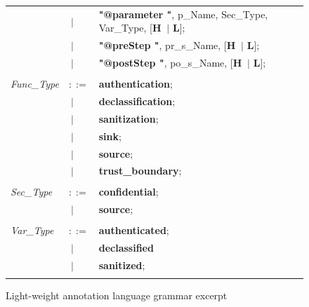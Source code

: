 \begin{figure}[ht!]
\begin{tabular}{lll}
 		&\footnotesize $\ \vert $    &\footnotesize \textbf{"@parameter "},   p\_Name,  Sec\_Type, Var\_Type,    [\textbf{H} $\ \vert $  \textbf{L}];    \\
 		&\footnotesize $\ \vert $    &\footnotesize \textbf{"@preStep "},     pr\_s\_Name,             [\textbf{H} $\ \vert $  \textbf{L}];    \\
 		&\footnotesize $\ \vert $    &\footnotesize \textbf{"@postStep "},    po\_s\_Name,             [\textbf{H} $\ \vert $  \textbf{L}];    \\ \\                                        
 		\footnotesize                       
 		\textit{Func\_Type}          &\footnotesize $::=$        &\footnotesize \textbf{authentication};\\
 		&\footnotesize $\ \vert $ &\footnotesize \textbf{declassification}; \\
 		&\footnotesize $\ \vert $    &\footnotesize \textbf{sanitization};     \\
 		&\footnotesize $\ \vert $    &\footnotesize \textbf{sink};             \\
 		&\footnotesize $\ \vert $    &\footnotesize \textbf{source};           \\
 		&\footnotesize $\ \vert $    &\footnotesize \textbf{trust\_boundary};  \\ \\
 		\footnotesize                       
 		\textit{Sec\_Type}           &\footnotesize $::=$         &\footnotesize \textbf{confidential}; \\
 		&\footnotesize $\ \vert $    &\footnotesize \textbf{source};    \\ \\
 		\footnotesize                       
 		\textit{Var\_Type}           &\footnotesize $::=$         &\footnotesize \textbf{authenticated}; \\
 		&\footnotesize $\ \vert $    &\footnotesize \textbf{declassified}
 		\\
 		&\footnotesize $\ \vert $    &\footnotesize \textbf{sanitized};    \\ \\	
 		
 	\end{tabular}
 	\caption{Light-weight annotation language grammar excerpt}
 	\label{language grammar}
 \end{figure}
 
